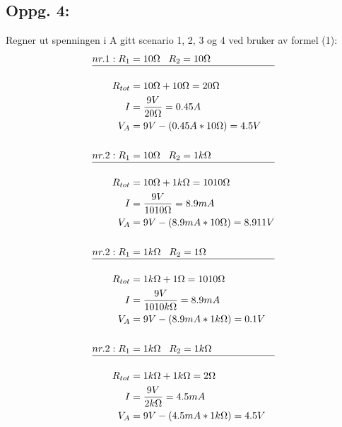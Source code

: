 \documentclass{article}
\begin{document}
            \subsection*{Oppg. 4:}
            Regner ut spenningen i A gitt scenario 1, 2, 3 og 4 ved bruker av formel (1):
            \begin{equation*}
                \begin{split}
                    nr. 1: R_1 &= 10\Omega \;\;\; R_2 = 10\Omega \\
                    \hline \\
                    R_{tot} &= 10\Omega + 10\Omega = 20\Omega \\
                    I &= \dfrac{9V}{20\Omega} = 0.45A \\
                    V_A &= 9V-(0.45A*10\Omega) = 4.5V \\
                    \\
                    nr. 2: R_1 &= 10\Omega \;\;\; R_2 = 1k\Omega \\
                    \hline \\
                    R_{tot} &= 10\Omega + 1k\Omega = 1010\Omega \\
                    I &= \dfrac{9V}{1010\Omega} = 8.9mA \\
                    V_A &= 9V-(8.9mA*10\Omega) = 8.911V \\
                    \\
                    nr. 2: R_1 &= 1k\Omega \;\;\; R_2 = 1\Omega \\
                    \hline \\
                    R_{tot} &= 1k\Omega + 1\Omega = 1010\Omega \\
                    I &= \dfrac{9V}{1010k\Omega} = 8.9mA \\
                    V_A &= 9V-(8.9mA*1k\Omega) = 0.1V \\
                    \\
                    nr. 2: R_1 &= 1k\Omega \;\;\; R_2 = 1k\Omega \\
                    \hline \\
                    R_{tot} &= 1k\Omega + 1k\Omega = 2\Omega \\
                    I &= \dfrac{9V}{2k\Omega} = 4.5mA \\
                    V_A &= 9V-(4.5mA*1k\Omega) = 4.5V \\
                \end{split}
            \end{equation*}
\end{document}
